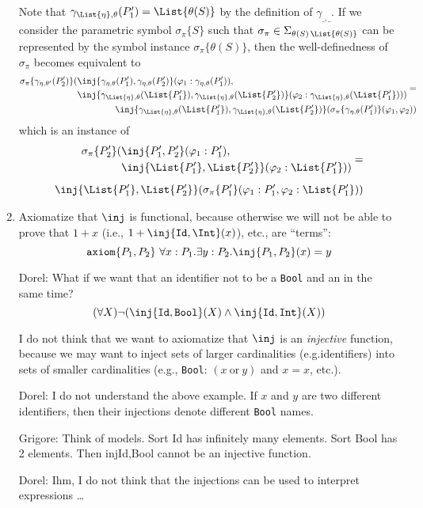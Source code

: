 \documentclass{article}
\newcommand\comment[2]{\par\noindent\color{red}#1: #2\color{black}\par\noindent}
\newcommand\dl{\comment{Dorel}}
\newcommand\gr{\comment{Grigore}}
\theoremstyle{definition}
\theoremstyle{definition}
\theoremstyle{definition}
\theoremstyle{definition}
\theoremstyle{theorem}
\theoremstyle{theorem}
\theoremstyle{theorem}
\theoremstyle{theorem}
\theoremstyle{theorem}
\newcommand{\axiom}{\texttt{axiom}}
\begin{document}
\begin{enumerate}[label=(\arabic*)]
{\[\begin{split}
\end{split}
\]
Note that $\gamma_{\List{\eta},\theta}(P'_1) = \List{\theta(S)}$ by the definition of $\gamma_{\_,\_}$.
If we consider the parametric symbol $\sigma_\pi\{S\}$ such that $\sigma_\pi\in\Sigma_{\theta(S)\,\List{\theta(S)}}$ can be represented by the symbol instance $\sigma_\pi\{\theta(S)\}$, then the well-definedness of $\sigma_\pi$ becomes equivalent to
\[
\begin{split}
\begin{aligned}
\sigma_\pi\{\gamma_{\eta,\theta'}(P'_2)\}(&\inj\{\gamma_{\eta,\theta}(P'_1),\gamma_{\eta,\theta}(P'_2)\}(\varphi_1:\gamma_{\eta,\theta}(P'_1)), \\
&\inj\{\gamma_{\List{\eta},\theta}(\List{P'_1}),\gamma_{\List{\eta},\theta}(\List{P'_2})\}(\varphi_2:\gamma_{\List{\eta},\theta}(\List{P'_1})))
\end{aligned}=\\
\inj\{\gamma_{\List{\eta},\theta}(\List{P'_1}),\gamma_{\List{\eta},\theta}(\List{P'_2})\}(\sigma_\pi\{\gamma_{\eta,\theta}(P'_1)\}(\varphi_1,\varphi_2))
\end{split}
\]
which is an instance of 
\[
\begin{split}
\begin{aligned}
\sigma_\pi\{P'_2\}(&\inj\{P'_1,P'_2\}(\varphi_1:P'_1), \\
&\inj\{\List{P'_1},\List{P'_2}\}(\varphi_2:\List{P'_1}))
\end{aligned}=\\[1ex]
\inj\{\List{P'_1},\List{P'_2}\}(\sigma_\pi\{P'_1\}(\varphi_1:P'_1,\varphi_2:\List{P'_1}))
\end{split}
\]
}

\item\label{axiom-functional}
Axiomatize that \(\inj\) is functional, because otherwise we will not
be able to prove that \(1+x\) (i.e., \(1 + \inj\{\texttt{Id}, \Int\}(x)\)), etc., are ``terms'':
\[\axiom\{P_1,P_2\}\ \forall x:P_1.\exists y:P_2.\inj\{P_1,P_2\}(x)=y\]
\dl{What if we want that an identifier not to be a \texttt{Bool} and an \Int{} in the same time?\\
\[(\forall X)\neg (\inj\{\texttt{Id},\texttt{Bool}\}(X)
  \land \inj\{\texttt{Id},\texttt{Int}\}(X))\]}
I do not think that we want to axiomatize that \(\inj\) is an
\emph{injective} function, because we may want to inject sets of larger
cardinalities (e.g.identifiers) into sets of smaller cardinalities
(e.g., \texttt{Bool}: \((x\ \text{or}\ y)\) and \(x=x\), etc.).
\dl{I do not understand the above example. If $x$ and $y$ are two different identifiers, then their injections denote different \texttt{Bool} names.}
\gr{Think of models.  Sort Id has infinitely many elements.  Sort Bool has 2 elements.  Then inj{Id,Bool} cannot be an injective function.}
\dl{Ihm, I do not think that the injections can be used to interpret expressions \ldots }


\end{enumerate}
\end{document}
